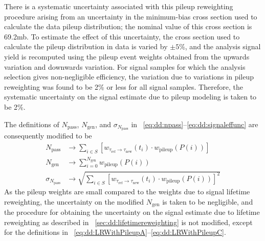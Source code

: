 There is a systematic uncertainty associated with this pileup reweighting procedure arising from an uncertainty in the minimum-bias \pp cross section used to calculate the data pileup distribution; the nominal value of this cross section is 69.2\unit{mb}.
To estimate the effect of this uncertainty, the \pp cross section used to calculate the pileup distribution in data is varied by $\pm 5\%$, and the analysis signal yield is recomputed using the pileup event weights obtained from the upwards variation and downwards variation.
For signal samples for which the analysis selection gives non-negligible efficiency, the variation due to variations in pileup reweighting was found to be 2\% or less for all signal samples.
Therefore, the systematic uncertainty on the signal estimate due to pileup modeling is taken to be 2\%.

The definitions of $N_\text{pass}$, $N_\text{gen}$, and $\sigma_{N_\text{pass}}$ in \Eqs~\ref{eq:dd:npass}--\ref{eq:dd:signaleffunc} are consequently modified to be
\begin{align}
  \label{eq:dd:LRWithPileupA}
  N_\text{pass}          &\to \sum_{i\in S}{\left[w_{\tau_\text{ref}\to\tau_\text{new}}(t_i) \cdot w_\text{pileup}(P(i))\right]} \\
  \label{eq:dd:LRWithPileupB}
  N_\text{gen}           &\to \sum_{i = 0}^{N_\text{gen}}{w_\text{pileup}(P(i))} \\
  \label{eq:dd:LRWithPileupC}
  \sigma_{N_\text{pass}} &\to \sqrt{\sum_{i\in S}{\left[w_{\tau_\text{ref}\to\tau_\text{new}}(t_i) \cdot w_\text{pileup}(P(i))\right]^2}}
\end{align}
As the pileup weights are small compared to the weights due to signal lifetime reweighting, the uncertainty on the modified $N_\text{gen}$ is taken to be negligible, and the procedure for obtaining the uncertainty on the signal estimate due to lifetime reweighting as described in \Sec~\ref{sec:dd:lifetimereweighting} is not modified, except for the definitions in \Eqs~\ref{eq:dd:LRWithPileupA}--\ref{eq:dd:LRWithPileupC}.

